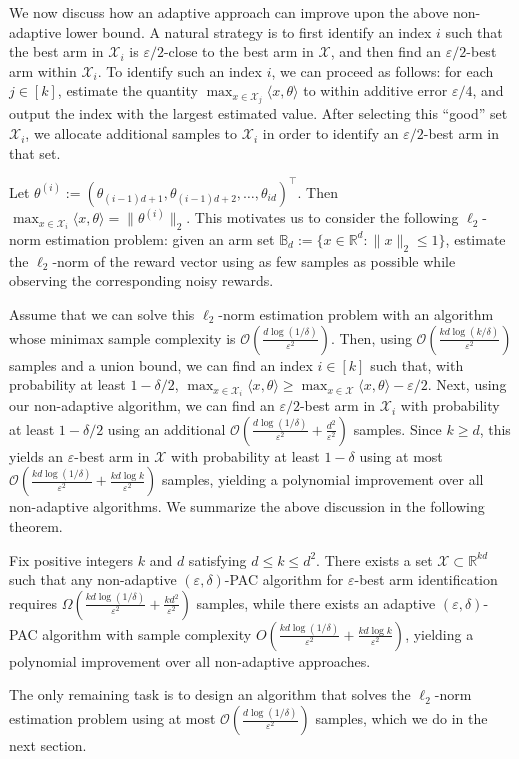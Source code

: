 We now discuss how an adaptive approach can improve upon the above non-adaptive lower bound. A natural strategy is to first identify an index $i$ such that the best arm in $\mathcal{X}_i$ is $\varepsilon/2$-close to the best arm in $\mathcal{X}$, and then find an $\varepsilon/2$-best arm within $\mathcal{X}_i$. To identify such an index $i$, we can proceed as follows: for each $j\in[k]$, estimate the quantity $\max_{x\in\mathcal{X}_j}\langle x,\theta\rangle$ to within additive error $\varepsilon/4$, and output the index with the largest estimated value. After selecting this ``good'' set $\mathcal{X}_i$, we allocate additional samples to $\mathcal{X}_i$ in order to identify an $\varepsilon/2$-best arm in that set.


Let $\theta^{(i)} := (\theta_{(i-1)d+1},\theta_{(i-1)d+2},\ldots,\theta_{id})^\top$. Then $\max_{x\in\mathcal{X}_i}\langle x,\theta\rangle=\|\theta^{(i)}\|_2$. This motivates us to consider the following $\ell_2$-norm estimation problem: given an arm set $\mathbb{B}_d:=\{x\in\mathbb{R}^d:\|x\|_2\leq 1\}$, estimate the $\ell_2$-norm of the reward vector using as few samples as possible while observing the corresponding noisy rewards.

Assume that we can solve this $\ell_2$-norm estimation problem with an algorithm whose minimax sample complexity is $\mathcal{O}\!\left(\frac{d\log(1/\delta)}{\varepsilon^2}\right)$. Then, using $\mathcal{O}\!\left(\frac{kd\log(k/\delta)}{\varepsilon^2}\right)$ samples and a union bound, we can find an index $i\in[k]$ such that, with probability at least $1-\delta/2$, $\max_{x\in\mathcal{X}_i}\langle x,\theta\rangle \ge \max_{x\in\mathcal{X}}\langle x,\theta\rangle-\varepsilon/2$. Next, using our non-adaptive algorithm, we can find an $\varepsilon/2$-best arm in $\mathcal{X}_i$ with probability at least $1-\delta/2$ using an additional $\mathcal{O}\!\left(\frac{d\log(1/\delta)}{\varepsilon^2}+\frac{d^2}{\varepsilon^2}\right)$ samples. Since $k\ge d$, this yields an $\varepsilon$-best arm in $\mathcal{X}$ with probability at least $1-\delta$ using at most $\mathcal{O}\!\left(\frac{kd\log(1/\delta)}{\varepsilon^2}+\frac{kd\log k}{\varepsilon^2}\right)$ samples, yielding a polynomial improvement over all non-adaptive algorithms. We summarize the above discussion in the following theorem.
\begin{theorem}\label{thm:adaptivity-gap-kd}
Fix positive integers $k$ and $d$ satisfying $d\le k\le d^2$.
There exists a set $\mathcal{X}\subset \mathbb{R}^{kd}$ such that any non-adaptive $(\varepsilon,\delta)$-PAC algorithm for $\varepsilon$-best arm identification requires
$\Omega\!\left(\frac{kd\log(1/\delta)}{\varepsilon^2}+\frac{kd^2}{\varepsilon^2}\right)$
samples, while there exists an adaptive $(\varepsilon,\delta)$-PAC algorithm with sample complexity
$O\!\left(\frac{kd\log(1/\delta)}{\varepsilon^2}+\frac{kd\log k}{\varepsilon^2}\right)$,
yielding a polynomial improvement over all non-adaptive approaches.
\end{theorem}
The only remaining task is to design an algorithm that solves the $\ell_2$-norm estimation problem using at most $\mathcal{O}\!\left(\frac{d\log(1/\delta)}{\varepsilon^2}\right)$ samples, which we do in the next section.


